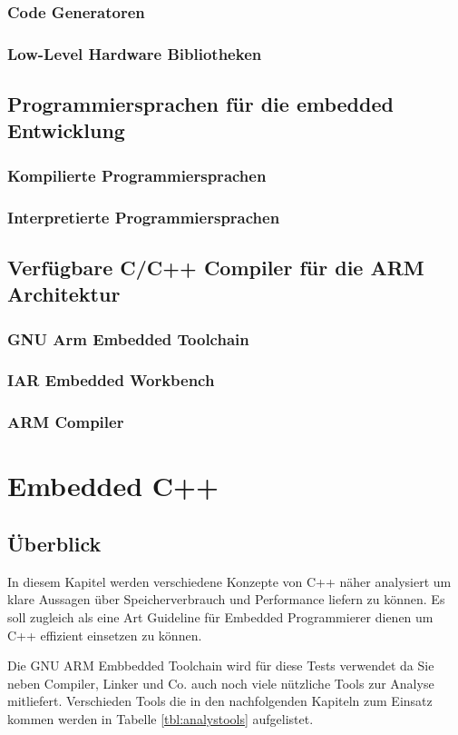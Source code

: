 \documentclass[MES,Master,ngerman]{twbook}%
\begin{document}
\subsection{Code Generatoren}
\subsection{Low-Level Hardware Bibliotheken}
\section{Programmiersprachen für die embedded Entwicklung}
\subsection{Kompilierte Programmiersprachen}
\subsection{Interpretierte Programmiersprachen}
\section{Verfügbare C/C++ Compiler für die ARM Architektur}
\subsection{GNU Arm Embedded Toolchain}
\subsection{IAR Embedded Workbench}
\subsection{ARM Compiler}


\chapter{Embedded C++}
\section{Überblick}
In diesem Kapitel werden verschiedene Konzepte von C++ näher analysiert um klare Aussagen über Speicherverbrauch und Performance liefern zu können. Es soll zugleich als eine Art Guideline für Embedded Programmierer dienen um C++ effizient einsetzen zu können. \newline 

Die GNU ARM Embbedded Toolchain wird für diese Tests verwendet da Sie neben Compiler, Linker und Co. auch noch viele nützliche Tools zur Analyse mitliefert. Verschieden Tools die in den nachfolgenden Kapiteln zum Einsatz kommen werden in Tabelle \ref{tbl:analystools} aufgelistet.
\end{document}
